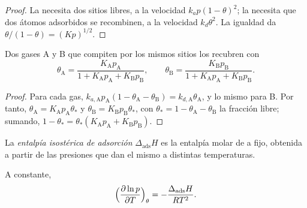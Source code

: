 \begin{proof}
La  necesita dos sitios libres, a la velocidad $k_ap(1 - \theta)^2$; la  necesita que dos
átomos adsorbidos se recombinen, a la velocidad $k_d\theta^2$. La igualdad da $\theta/(1 - \theta) =
(Kp)^{1/2}$.
\end{proof}

\begin{proposition}\label{prop:b3:surfaces-catalysis:competitive}
Dos gases A y B que compiten por los mismos sitios los recubren con
\[
  \theta_{\mathrm A} = \frac{K_{\mathrm A}p_{\mathrm A}}{1 + K_{\mathrm A}p_{\mathrm A} + K_{\mathrm B}p_{\mathrm B}}, \qquad
  \theta_{\mathrm B} = \frac{K_{\mathrm B}p_{\mathrm B}}{1 + K_{\mathrm A}p_{\mathrm A} + K_{\mathrm B}p_{\mathrm B}} .
\]
\end{proposition}

\begin{proof}
Para cada gas, $k_{a,\mathrm A}p_{\mathrm A}(1 - \theta_{\mathrm A} - \theta_{\mathrm B}) = k_{d,\mathrm A}\theta_{\mathrm A}$, y lo mismo para B. Por tanto,
$\theta_{\mathrm A} = K_{\mathrm A}p_{\mathrm A}\theta_\ast$ y $\theta_{\mathrm B} = K_{\mathrm B}p_{\mathrm B}\theta_\ast$, con $\theta_\ast = 1 - \theta_{\mathrm A} - \theta_{\mathrm B}$ la fracción libre; sumando,
$1 - \theta_\ast = \theta_\ast(K_{\mathrm A}p_{\mathrm A} + K_{\mathrm B}p_{\mathrm B})$.
\end{proof}

\begin{definition}\label{def:b3:surfaces-catalysis:isosteric}
La \emph{entalpía isostérica de adsorción}
$\Delta_{\mathrm{ads}}H$ es la entalpía molar de  a  fijo,
obtenida a partir de las presiones que dan el mismo  a distintas
temperaturas.
\end{definition}

\begin{proposition}\label{prop:b3:surfaces-catalysis:isosteric}
A  constante,
\[
  \Bigl(\frac{\partial\ln p}{\partial T}\Bigr)_\theta = -\frac{\Delta_{\mathrm{ads}}H}{RT^2} .
\]
\end{proposition}

